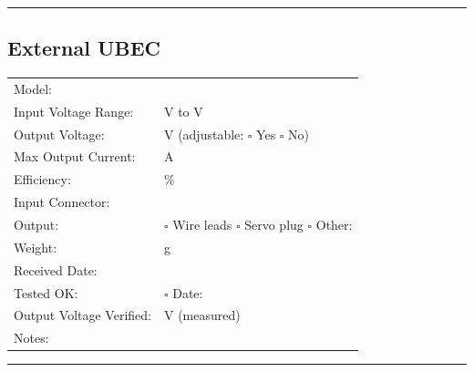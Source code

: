 \documentclass[10pt,letterpaper]{article}
\begin{document}
\vspace{0.5em}
\hrule
\vspace{0.5em}

\subsection*{External UBEC}
\begin{tabularx}{\textwidth}{lX}
Model: & \underline{\hspace{8cm}} \\
Input Voltage Range: & \underline{\hspace{3cm}} V to \underline{\hspace{3cm}} V \\
Output Voltage: & \underline{\hspace{3cm}} V \quad (adjustable: $\square$ Yes $\square$ No) \\
Max Output Current: & \underline{\hspace{4cm}} A \\
Efficiency: & \underline{\hspace{4cm}} \% \\
Input Connector: & \underline{\hspace{6cm}} \\
Output: & $\square$ Wire leads $\square$ Servo plug $\square$ Other: \underline{\hspace{3cm}} \\
Weight: & \underline{\hspace{4cm}} g \\[0.5em]
Received Date: & \underline{\hspace{4cm}} \\
Tested OK: & $\square$ \quad Date: \underline{\hspace{3cm}} \\
Output Voltage Verified: & \underline{\hspace{3cm}} V (measured) \\
Notes: & \underline{\hspace{10cm}} \\
\end{tabularx}

\vspace{0.5em}
\hrule
\vspace{0.5em}
\end{document}
